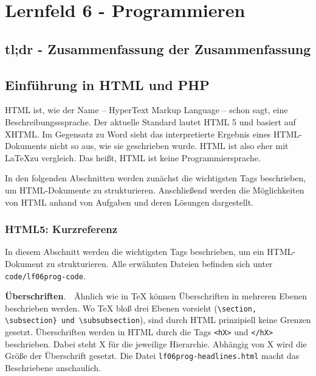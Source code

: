 \section{Lernfeld 6 - Programmieren}

\subsection{tl;dr - Zusammenfassung der Zusammenfassung}

\subsection{Einführung in HTML und PHP}

HTML ist, wie der Name -- HyperText Markup Language -- schon sagt, eine Beschreibungsssprache. Der aktuelle Standard lautet HTML 5 und basiert auf XHTML. Im Gegensatz zu Word sieht das interpretierte Ergebnis eines HTML-Dokuments nicht so aus, wie sie geschrieben wurde. HTML ist also eher mit \LaTeX zu vergleich. Das heißt, HTML ist keine Programmiersprache.

In den folgenden Abschnitten werden zunächst die wichtigsten Tags beschrieben, um HTML-Dokumente zu strukturieren. Anschließend werden die Möglichkeiten von HTML anhand von Aufgaben und deren Lösungen dargestellt.

\subsubsection{HTML5: Kurzreferenz}
In diesem Abschnitt werden die wichtigsten Tags beschrieben, um ein HTML-Dokument zu strukturieren. Alle erwähnten Dateien befinden sich unter \texttt{code/lf06prog-code}.\newline

{\bf Überschriften}.\ \ Ähnlich wie in TeX können Überschriften in mehreren Ebenen beschrieben werden. Wo TeX bloß drei Ebenen vorsieht (\verb+\section, \subsection} und \subsubsection+), sind durch HTML prinzipiell keine Grenzen gesetzt. Überschriften werden in HTML durch die Tags \texttt{<hX>} und \texttt{</hX>} beschrieben. Dabei steht X für die jeweilige Hierarchie. Abhängig von X wird die Größe der Überschrift gesetzt. Die Datei \texttt{lf06prog-headlines.html} macht das Beschriebene anschaulich.\newline

